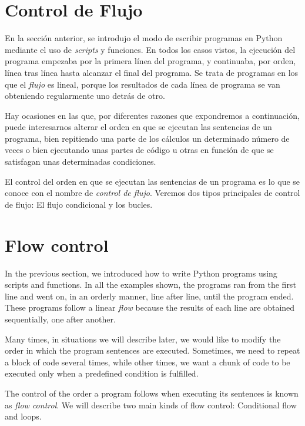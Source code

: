 \begin{paracol}{2}
\section[Control de flujo]{Control de Flujo} 
En la sección anterior, se introdujo el modo de escribir programas en Python mediante el uso de 	\emph{scripts} y funciones. En todos los casos vistos, la ejecución del programa empezaba por la primera línea del programa, y continuaba, por orden, línea tras línea hasta alcanzar el final del programa. Se trata de programas en los que el \emph{flujo} es lineal, porque los resultados de cada línea de programa se van obteniendo regularmente uno detrás de otro. 

Hay ocasiones en las que, por diferentes razones que expondremos a continuación, puede interesarnos alterar el orden en que se ejecutan las sentencias de un programa, bien repitiendo una parte de los cálculos un determinado número de veces o bien ejecutando unas partes de código u otras en función de que se satisfagan unas determinadas condiciones.

El control del orden en que se ejecutan las sentencias de un programa es lo que se conoce con el nombre de \emph{control de flujo}. Veremos dos tipos principales de control de flujo: El flujo condicional y los bucles.

\switchcolumn
\section{Flow control}  
In the previous section, we introduced how to write Python programs using scripts and functions. In all the examples shown, the programs ran from the first line and went on, in an orderly manner, line after line, until the program ended. These programs follow a linear \emph{flow} because the results of each line are obtained sequentially, one after another.

Many times, in situations we will describe later, we would like to modify the order in which the program sentences are executed. Sometimes, we need to repeat a block of code several times, while other times, we want a chunk of code to be executed only when a predefined condition is fulfilled. 

The control of the order a program follows when executing its sentences is known as \emph{flow control}. We will describe two main kinds of flow control: Conditional flow and loops.
\end{paracol}

